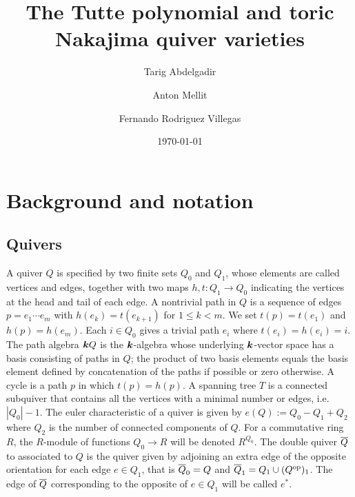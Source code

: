 \documentclass{amsart}
\title{The Tutte polynomial and toric Nakajima quiver varieties}
\author{Tarig Abdelgadir}
\author{Anton Mellit}
\author{Fernando Rodriguez Villegas}
\date{\today}
\theoremstyle{definition}
\begin{document}
\maketitle




\section{Background and notation}
\subsection{Quivers}
A quiver $Q$ is specified by two finite sets $Q_0$ and $Q_1$, whose elements are called vertices and edges, together with two maps $h, t \colon Q_1 \rightarrow Q_0$ indicating the vertices at the head and tail of each edge.
A nontrivial path in $Q$ is a sequence of edges $p = e_1 \dotsb e_m$ with $h(e_{k}) = t(e_{k+1})$ for $1 \leq k < m$.  We set $t(p) = t(e_{1})$ and $h(p)= h(e_m)$.  
Each $i \in Q_0$ gives a trivial path $e_i$ where $t(e_i) = h(e_i) = i$.  
The path algebra ${\boldsymbol{k}} Q$ is the ${\boldsymbol{k}}$-algebra whose underlying ${\boldsymbol{k}}$-vector space has a basis consisting of paths in $Q$; the product of two basis elements equals the basis element defined by concatenation of the paths if possible or zero otherwise.  
A cycle is a path $p$ in which $t(p) = h(p)$. 
A spanning tree $T$ is a connected subquiver that contains all the vertices with a minimal number or edges, i.e. $|Q_0|-1$.
The euler characteristic of a quiver is given by $e(Q):= Q_0 - Q_1 +Q_2$ where $Q_2$ is the number of connected components of $Q$.
For a commutative ring $R$, the $R$-module of functions $Q_0 \rightarrow R$ will be denoted $R^{Q_0}$.
The double quiver ${\overline{Q}}$ to associated to $Q$ is the quiver given by adjoining an extra edge of the opposite orientation for each edge $e \in Q_1$, that is ${\overline{Q}}_0 = Q$ and ${\overline{Q}}_1= Q_1 \cup (Q^\text{op})_1$.
The edge of ${\overline{Q}}$ corresponding to the opposite of $e \in Q_1$ will be called $e^*$.
\end{document}
